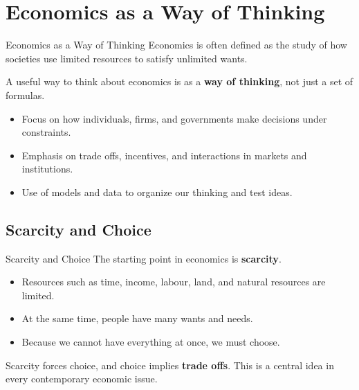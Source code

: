 \documentclass[aspectratio=169]{beamer}
\begin{document}
\section{Economics as a Way of Thinking}

\begin{frame}{Economics as a Way of Thinking}
  \transfade
  Economics is often defined as the study of how societies use limited resources to satisfy
  unlimited wants.

  \vspace{0.3cm}
  A useful way to think about economics is as a \textbf{way of thinking}, not just a set of formulas.

  \begin{itemize}[<+->]
    \item Focus on how individuals, firms, and governments make decisions under constraints.
    \item Emphasis on trade offs, incentives, and interactions in markets and institutions.
    \item Use of models and data to organize our thinking and test ideas.
  \end{itemize}
\end{frame}

\subsection{Scarcity and Choice}

\begin{frame}{Scarcity and Choice}
  \transfade
  The starting point in economics is \textbf{scarcity}.

  \begin{itemize}[<+->]
    \item Resources such as time, income, labour, land, and natural resources are limited.
    \item At the same time, people have many wants and needs.
    \item Because we cannot have everything at once, we must choose.
  \end{itemize}

  \vspace{0.3cm}
  Scarcity forces choice, and choice implies \textbf{trade offs}. This is a central idea in every
  contemporary economic issue.
\end{frame}
\end{document}
